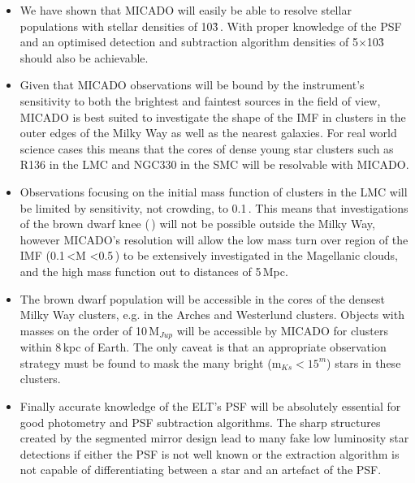 \begin{itemize}
    \item We have shown that MICADO will easily be able to resolve stellar populations with stellar densities of 10\h3\,\spa. With proper knowledge of the PSF and an optimised detection and subtraction algorithm densities of 5$\times$10\h3\,\spa should also be achievable.

    \item Given that MICADO observations will be bound by the instrument's sensitivity to both the brightest and faintest sources in the field of view, MICADO is best suited to investigate the shape of the IMF in clusters in the outer edges of the Milky Way as well as the nearest galaxies. For real world science cases this means that the cores of dense young star clusters such as R136 in the LMC and NGC330 in the SMC will be resolvable with MICADO.
    
    \item Observations focusing on the initial mass function of clusters in the LMC will be limited by sensitivity, not crowding, to 0.1\,\msun. This means that investigations of the brown dwarf knee (\,\msun) will not be possible outside the Milky Way, however MICADO's resolution will allow the low mass turn over region of the IMF (0.1\,\msun\textless M \textless0.5\,\msune) to be extensively investigated in the Magellanic clouds, and the high mass function out to distances of 5\,Mpc.
    
    \item The brown dwarf population will be accessible in the cores of the densest Milky Way clusters, e.g. in the Arches and Westerlund clusters. Objects with masses on the order of 10\,M$_{Jup}$ will be accessible by MICADO for clusters within 8\,kpc of Earth. The only caveat is that an appropriate observation strategy must be found to mask the many bright (m$_{Ks}<15^m$) stars in these clusters.
    
    \item Finally accurate knowledge of the ELT's PSF will be absolutely essential for good photometry and PSF subtraction algorithms. The sharp structures created by the segmented mirror design lead to many fake low luminosity star detections if either the PSF is not well known or the extraction algorithm is not capable of differentiating between a star and an artefact of the PSF.
    
\end{itemize}





